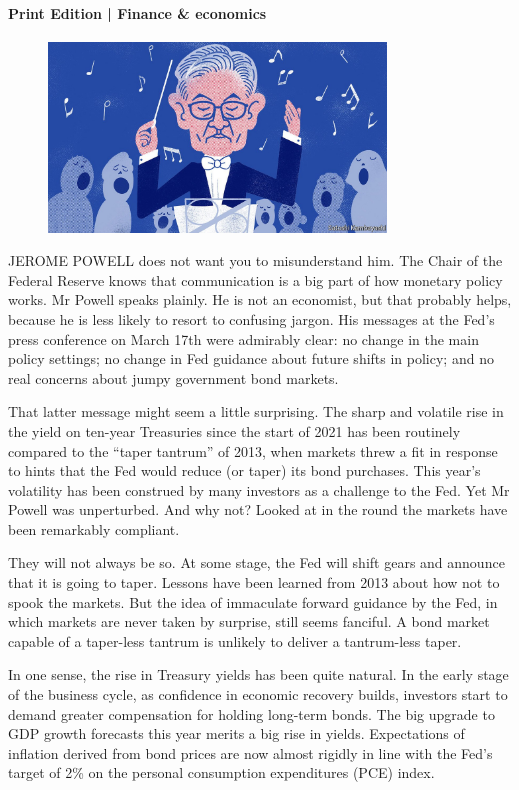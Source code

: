 \documentclass{article}
\begin{document}
\paragraph{Print Edition | Finance \& economics  \quad \color{gray}{Mar 27th 2021 }}
\begin{figure}[h]
\centering
\includegraphics[width=0.8\textwidth]{images/20210327_FND002_0.jpg}
\end{figure}
\lettrine{J}EROME POWELL does not want you to misunderstand him. The Chair of the Federal Reserve knows that communication is a big part of how monetary policy works. Mr Powell speaks plainly. He is not an economist, but that probably helps, because he is less likely to resort to confusing jargon. His messages at the Fed's press conference on March 17th were admirably clear: no change in the main policy settings; no change in Fed guidance about future shifts in policy; and no real concerns about jumpy government bond markets. 

That latter message might seem a little surprising. The sharp and volatile rise in the yield on ten-year Treasuries since the start of 2021 has been routinely compared to the ``taper tantrum'' of 2013, when markets threw a fit in response to hints that the Fed would reduce (or taper) its bond purchases. This year's volatility has been construed by many investors as a challenge to the Fed. Yet Mr Powell was unperturbed. And why not? Looked at in the round the markets have been remarkably compliant. 

They will not always be so. At some stage, the Fed will shift gears and announce that it is going to taper. Lessons have been learned from 2013 about how not to spook the markets. But the idea of immaculate forward guidance by the Fed, in which markets are never taken by surprise, still seems fanciful. A bond market capable of a taper-less tantrum is unlikely to deliver a tantrum-less taper. 

In one sense, the rise in Treasury yields has been quite natural. In the early stage of the business cycle, as confidence in economic recovery builds, investors start to demand greater compensation for holding long-term bonds. The big upgrade to GDP growth forecasts this year merits a big rise in yields. Expectations of inflation derived from bond prices are now almost rigidly in line with the Fed's target of 2\% on the personal consumption expenditures (PCE) index. 
\end{document}
